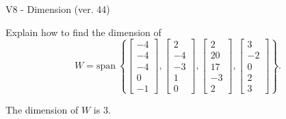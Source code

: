 \begin{exercise}
  \begin{exerciseTitle}V8 - Dimension (ver. 44)\end{exerciseTitle}
  \begin{exerciseStatement}
    Explain how to find the dimension of 
\[W=\mathrm{span}\ \left\{\left[\begin{array}{r}
-4 \\
-4 \\
-4 \\
0 \\
-1
\end{array}\right] , \left[\begin{array}{r}
2 \\
-4 \\
-3 \\
1 \\
0
\end{array}\right] , \left[\begin{array}{r}
2 \\
20 \\
17 \\
-3 \\
2
\end{array}\right] , \left[\begin{array}{r}
3 \\
-2 \\
0 \\
2 \\
3
\end{array}\right]\right\}.\]



  \end{exerciseStatement}
  \begin{exerciseAnswer}
   The dimension of \(W\) is  \(3\).
  


  \end{exerciseAnswer}
\end{exercise}